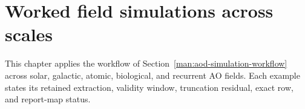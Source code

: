 \section{Worked field simulations across scales}
\label{man:worked-field-simulations}

This chapter applies the workflow of Section~\ref{man:aod-simulation-workflow} across solar, galactic, atomic, biological, and recurrent AO fields. Each example states its retained extraction, validity window, truncation residual, exact row, and report-map status.
